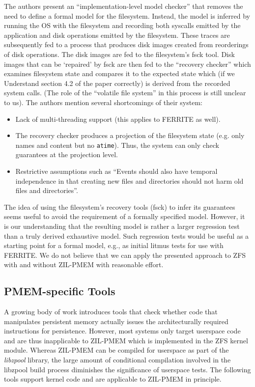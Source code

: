 \documentclass[12pt,a4paper,twoside]{book}
\begin{document}
The authors present an “implementation-level model checker” that removes the need to define a formal model for the filesystem.
Instead, the model is inferred by running the OS with the filesystem and recording both syscalls emitted by the application and disk operations emitted by the filesystem.
These traces are subsequently fed to a process that produces disk images created from reorderings of disk operations.
The disk images are fed to the filesystem’s fsck tool.
Disk images that can be ‘repaired’ by fsck are then fed to the “recovery checker” which examines filesystem state and compares it to the expected state which (if we Understand section 4.2 of the paper correctly) is derived from the recorded system calls.
(The role of the “volatile file system” in this process is still unclear to us).
The authors mention several shortcomings of their system:
\begin{itemize}[noitemsep,beginpenalty=100000,midpenalty=100000]
    \item Lack of multi-threading support (this applies to FERRITE as well).
    \item The recovery checker produces a projection of the filesystem state (e.g. only names and content but no \lstinline{atime}).
          Thus, the system can only check guarantees at the projection level.
    \item Restrictive assumptions such as “Events should also have temporal independence in that creating new files and directories should not harm old files and directories”.
\end{itemize}
The idea of using the filesystem’s recovery tools (fsck) to infer its guarantees seems useful to avoid the requirement of a formally specified model.
However, it is our understanding that the resulting model is rather a larger regression test than a truly derived exhaustive model.
Such regression tests would be useful as a starting point for a formal model, e.g., as initial litmus tests for use with FERRITE.
We do not believe that we can apply the presented approach to ZFS with and without ZIL-PMEM with reasonable effort.

\subsection{PMEM-specific Tools}\label{sec:rel_work:pmemspecifictools}
A growing body of work introduces tools that check whether code that manipulates persistent memory actually issues the architecturally required instructions for persistence.
However, most systems only target userspace code and are thus inapplicable to ZIL-PMEM which is implemented in the ZFS kernel module.
Whereas ZIL-PMEM can be compiled for userspace as part of the \textit{libzpool} library, the large amount of conditional compilation involved in the libzpool build process diminishes the significance of userspace tests.
The following tools support kernel code and are applicable to ZIL-PMEM in principle.
\end{document}
